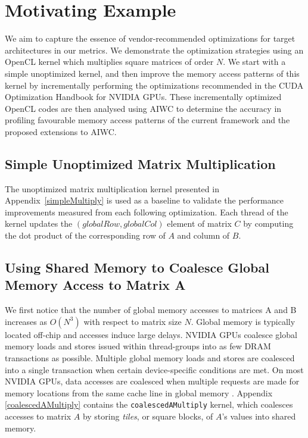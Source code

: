 \documentclass[review=false, sigchi]{acmart}
\begin{document}
	\section{Motivating Example} \label{motivating example}
	
	We aim to capture the essence of vendor-recommended optimizations for target architectures in our metrics.
	We demonstrate the optimization strategies using an OpenCL kernel which multiplies square matrices of order $N$.
	We start with a simple unoptimized kernel, and then improve the memory access patterns of this kernel by incrementally performing the optimizations recommended in the CUDA Optimization Handbook \cite{cudaoptimisation} for NVIDIA GPUs.
	These incrementally optimized OpenCL codes are then analysed using AIWC to determine the accuracy in profiling favourable memory access patterns of the current framework and the proposed extensions to AIWC.
	
	\subsection{Simple Unoptimized Matrix Multiplication}
	
	The unoptimized matrix multiplication kernel presented in Appendix~\ref{simpleMultiply} is used as a baseline to validate the performance improvements measured from each following optimization.
	Each thread of the kernel updates the $(globalRow, globalCol)$ element of matrix $C$ by computing the dot product of the corresponding row of $A$ and column of $B$.
	
	\subsection{Using Shared Memory to Coalesce Global Memory Access to Matrix A} 
	
	We first notice that the number of global memory accesses to matrices A and B increases as $O(N^3)$ with respect to matrix size $N$.
	Global memory is typically located off-chip and accesses induce large delays.
	NVIDIA GPUs coalesce global memory loads and stores issued within thread-groups into as few DRAM transactions as possible.
	Multiple global memory loads and stores are coalesced into a single transaction when certain device-specific conditions are met. 
	On most NVIDIA GPUs, data accesses are coalesced when multiple requests are made for memory locations from the same cache line in global memory \cite{cudamanual}. Appendix \ref{coalescedAMultiply} contains the \texttt{coalescedAMultiply} kernel, which coalesces accesses to matrix $A$ by storing \emph{tiles}, or square blocks, of $A$'s values into shared memory. 
	
\end{document}
